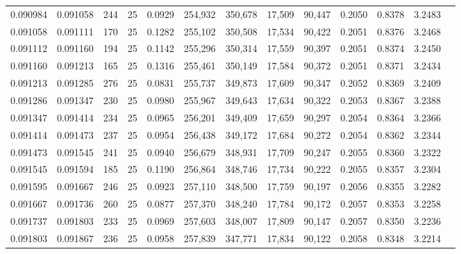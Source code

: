 \begin{tabular}{rrrrrrrrrrrrr}
0.090984 & 0.091058 &   244 &  25 &                                     0.0929 & 254,932 & 350,678 &  17,509 &  90,447 & 0.2050 & 0.8378 & 3.2483 \\
0.091058 & 0.091111 &   170 &  25 &                                     0.1282 & 255,102 & 350,508 &  17,534 &  90,422 & 0.2051 & 0.8376 & 3.2468 \\
0.091112 & 0.091160 &   194 &  25 &                                     0.1142 & 255,296 & 350,314 &  17,559 &  90,397 & 0.2051 & 0.8374 & 3.2450 \\
0.091160 & 0.091213 &   165 &  25 &                                     0.1316 & 255,461 & 350,149 &  17,584 &  90,372 & 0.2051 & 0.8371 & 3.2434 \\
0.091213 & 0.091285 &   276 &  25 &                                     0.0831 & 255,737 & 349,873 &  17,609 &  90,347 & 0.2052 & 0.8369 & 3.2409 \\
0.091286 & 0.091347 &   230 &  25 &                                     0.0980 & 255,967 & 349,643 &  17,634 &  90,322 & 0.2053 & 0.8367 & 3.2388 \\
0.091347 & 0.091414 &   234 &  25 &                                     0.0965 & 256,201 & 349,409 &  17,659 &  90,297 & 0.2054 & 0.8364 & 3.2366 \\
0.091414 & 0.091473 &   237 &  25 &                                     0.0954 & 256,438 & 349,172 &  17,684 &  90,272 & 0.2054 & 0.8362 & 3.2344 \\
0.091473 & 0.091545 &   241 &  25 &                                     0.0940 & 256,679 & 348,931 &  17,709 &  90,247 & 0.2055 & 0.8360 & 3.2322 \\
0.091545 & 0.091594 &   185 &  25 &                                     0.1190 & 256,864 & 348,746 &  17,734 &  90,222 & 0.2055 & 0.8357 & 3.2304 \\
0.091595 & 0.091667 &   246 &  25 &                                     0.0923 & 257,110 & 348,500 &  17,759 &  90,197 & 0.2056 & 0.8355 & 3.2282 \\
0.091667 & 0.091736 &   260 &  25 &                                     0.0877 & 257,370 & 348,240 &  17,784 &  90,172 & 0.2057 & 0.8353 & 3.2258 \\
0.091737 & 0.091803 &   233 &  25 &                                     0.0969 & 257,603 & 348,007 &  17,809 &  90,147 & 0.2057 & 0.8350 & 3.2236 \\
0.091803 & 0.091867 &   236 &  25 &                                     0.0958 & 257,839 & 347,771 &  17,834 &  90,122 & 0.2058 & 0.8348 & 3.2214 \\

\end{tabular}

